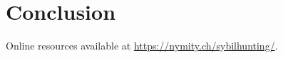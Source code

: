 \section{Conclusion}
\label{sec:conclusion}

Online resources available at \url{https://nymity.ch/sybilhunting/}.
